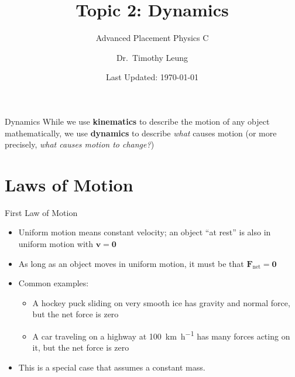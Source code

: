 \documentclass[12pt,compress,aspectratio=169]{beamer}
\title{Topic 2: Dynamics}
\subtitle{Advanced Placement Physics C}
\author[TML]{Dr.\ Timothy Leung}
\institute{Olympiads School}
\date{Last Updated: \today}
\begin{document}
\begin{frame}
  \maketitle
\end{frame}



\begin{frame}{Dynamics}
  While we use \textbf{kinematics} to describe the motion of any object
  mathematically, we use \textbf{dynamics} to describe \emph{what} causes
  motion (or more precisely, \emph{what causes motion to change?})
\end{frame}



\section{Laws of Motion}

\begin{frame}{First Law of Motion}
  \begin{center}
  \end{center}
  \begin{itemize}
  \item Uniform motion means constant velocity; an object ``at rest'' is also
    in uniform motion with $\bm{v}=\bm{0}$
  \item As long as an object moves in uniform motion, it must be that
    $\bm{F}_\text{net}=\bm{0}$
  \item Common examples:
    \begin{itemize}
    \item A hockey puck sliding on very smooth ice has gravity and normal
      force, but the net force is zero
    \item A car traveling on a highway at \SI{100}{\kilo\metre\per\hour}
      has many forces acting on it, but the net force is zero 
    \end{itemize}
  \item\textcolor{red!80!black}{This is a special case that assumes a constant
    mass.}
  \end{itemize}
\end{frame}
\end{document}
